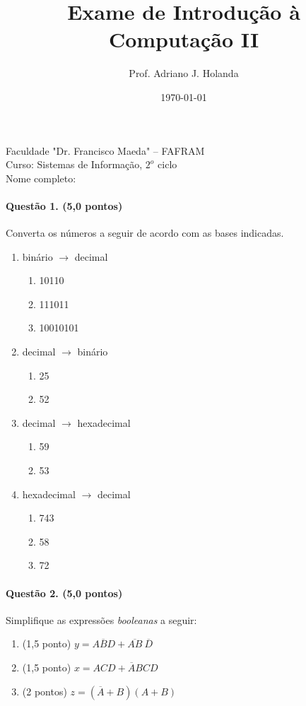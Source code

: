 \documentclass[12pt]{article}
\author{Prof. Adriano J. Holanda}
\title{Exame de Introdu\c{c}\~ao \`a Computa\c{c}\~ao II}
\date{\today}
\def\mynot#1{\overline{#1}}
\begin{document}
\maketitle

\noindent Faculdade "Dr. Francisco Maeda" -- FAFRAM\\
\noindent Curso: Sistemas de Informação, $2^o$ ciclo\\
\noindent Nome completo:

\paragraph{Quest\~ao 1. (5,0 pontos)} Converta os n\'umeros a seguir de
acordo com as bases indicadas.

\begin{enumerate}
\item bin\'ario $\rightarrow$ decimal
  \begin{enumerate}
  \item 10110
  \item 111011
  \item 10010101
  \end{enumerate}
\item decimal $\rightarrow$ bin\'ario
  \begin{enumerate}
    \item 25
    \item 52
  \end{enumerate}
\item decimal $\rightarrow$ hexadecimal
    \begin{enumerate}
      \item 59
      \item 53
    \end{enumerate}
  \item hexadecimal $\rightarrow$ decimal
  \begin{enumerate}
    \item 743
    \item 58
    \item 72
  \end{enumerate}
\end{enumerate}

\paragraph{Quest\~ao 2. (5,0 pontos)}
Simplifique as expressões {\em booleanas} a
seguir:

\begin{enumerate}
\item (1,5 ponto) $y = A\mynot{B}D + \mynot{AB}\ \mynot{D}$ %
\item (1,5 ponto) $x = ACD + \mynot{A}BCD$ %
\item (2 pontos) $z = (\mynot{A} + B)(A+B)$ %
\end{enumerate}


%
\end{document}
